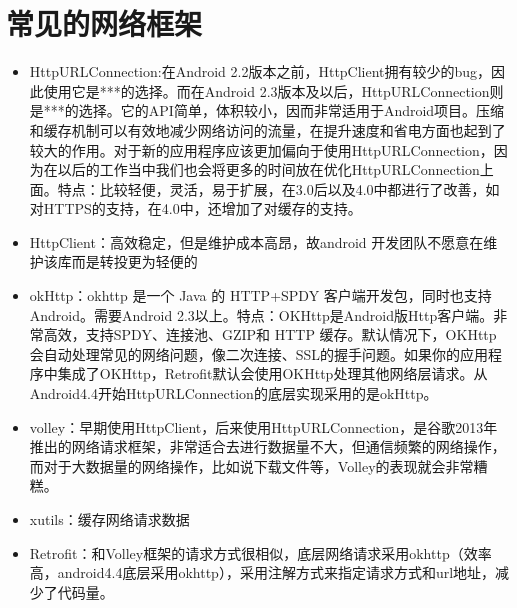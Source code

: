\documentclass[9pt, b5paper]{article}
\begin{document}
\section{常见的网络框架}
\label{sec-4}
\begin{itemize}
\item HttpURLConnection:在Android 2.2版本之前，HttpClient拥有较少的bug，因此使用它是***的选择。而在Android 2.3版本及以后，HttpURLConnection则是***的选择。它的API简单，体积较小，因而非常适用于Android项目。压缩和缓存机制可以有效地减少网络访问的流量，在提升速度和省电方面也起到了较大的作用。对于新的应用程序应该更加偏向于使用HttpURLConnection，因为在以后的工作当中我们也会将更多的时间放在优化HttpURLConnection上面。特点：比较轻便，灵活，易于扩展，在3.0后以及4.0中都进行了改善，如对HTTPS的支持，在4.0中，还增加了对缓存的支持。
\item HttpClient：高效稳定，但是维护成本高昂，故android 开发团队不愿意在维护该库而是转投更为轻便的
\item okHttp：okhttp 是一个 Java 的 HTTP+SPDY 客户端开发包，同时也支持 Android。需要Android 2.3以上。特点：OKHttp是Android版Http客户端。非常高效，支持SPDY、连接池、GZIP和 HTTP 缓存。默认情况下，OKHttp会自动处理常见的网络问题，像二次连接、SSL的握手问题。如果你的应用程序中集成了OKHttp，Retrofit默认会使用OKHttp处理其他网络层请求。从Android4.4开始HttpURLConnection的底层实现采用的是okHttp。
\item volley：早期使用HttpClient，后来使用HttpURLConnection，是谷歌2013年推出的网络请求框架，非常适合去进行数据量不大，但通信频繁的网络操作，而对于大数据量的网络操作，比如说下载文件等，Volley的表现就会非常糟糕。
\item xutils：缓存网络请求数据
\item Retrofit：和Volley框架的请求方式很相似，底层网络请求采用okhttp（效率高，android4.4底层采用okhttp），采用注解方式来指定请求方式和url地址，减少了代码量。
\end{itemize}
\end{document}

